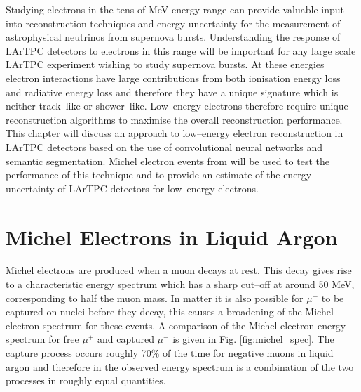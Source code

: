 Studying electrons in the tens of MeV energy range can provide valuable input 
into reconstruction techniques and energy uncertainty for the measurement of
astrophysical neutrinos from supernova bursts. Understanding the response of
LArTPC detectors to electrons in this range will be important for any large
scale LArTPC experiment wishing to study supernova bursts. At these energies
electron interactions have large contributions from both ionisation energy loss
and radiative energy loss and therefore they have a unique signature which is 
neither track--like or shower--like. Low--energy electrons therefore require 
unique reconstruction algorithms to maximise the overall reconstruction 
performance. This chapter will discuss an approach to low--energy electron
reconstruction in LArTPC detectors based on the use of convolutional neural
networks and semantic segmentation. Michel electron events from \protodune{} will
be used to test the performance of this technique and to provide an estimate of
the energy uncertainty of LArTPC detectors for low--energy electrons.


\section{Michel Electrons in Liquid Argon} \label{ME_LAr}

Michel electrons are produced when a muon decays at rest. This decay gives rise
to a characteristic energy spectrum which has a sharp cut--off at around 50 MeV,
corresponding to half the muon mass. In matter it is also possible for $\mu^-$ 
to be captured on nuclei before they decay, this causes a broadening of the 
Michel electron spectrum for these events. A comparison of the Michel electron 
energy spectrum for free $\mu^+$ and captured $\mu^-$ is given in Fig.
\ref{fig:michel_spec}. The capture process occurs roughly 70\% of the time for
negative muons in liquid argon and therefore in \protodune{} the observed energy
spectrum is a combination of the two processes in roughly equal quantities.

